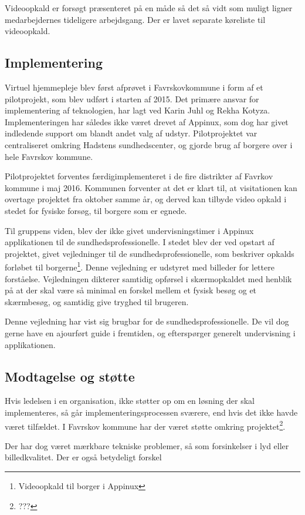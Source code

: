 Videoopkald er forsøgt præsenteret på en måde så det så vidt som muligt ligner medarbejdernes tideligere arbejdsgang. Der er lavet separate køreliste til videoopkald.

\subsection{Implementering}
Virtuel hjemmepleje blev først afprøvet i Favrskovkommune i form af et pilotprojekt, som blev udført i starten af 2015. Det primære ansvar for implementering af teknologien, har lagt ved Karin Juhl og Rekha Kotyza. Implementeringen har således ikke været drevet af Appinux, som dog har givet indledende support om blandt andet valg af udstyr. Pilotprojektet var centraliseret omkring Hadstens sundhedscenter, og gjorde brug af borgere over i hele Favrskov kommune.

Pilotprojektet forventes færdigimplementeret i de fire distrikter af Favrkov kommune i maj 2016. Kommunen forventer at det er klart til, at visitationen kan overtage projektet fra oktober samme år, og derved kan tilbyde video opkald i stedet for fysiske forsøg, til borgere som er egnede. 

Til gruppens viden, blev der ikke givet undervisningstimer i Appinux applikationen til de sundhedsprofessionelle. I stedet blev der ved opstart af projektet, givet vejledninger til de sundhedsprofessionelle, som beskriver opkalds forløbet til borgerne\footnote{Videoopkald til borger i Appinux}. Denne vejledning er udstyret med billeder for lettere forståelse. Vejledningen dikterer samtidig opførsel i skærmopkaldet med henblik på at der skal være så minimal en forskel mellem et fysisk besøg og et skærmbesøg, og samtidig give tryghed til brugeren. 

Denne vejledning har vist sig brugbar for de sundhedsprofessionelle. De vil dog gerne have en ajourført guide i fremtiden, og efterspørger generelt undervisning i applikationen.
 
\subsection{Modtagelse og støtte}
Hvis ledelsen i en organisation, ikke støtter op om en løsning der skal implementeres, så går implementeringsprocessen sværere, end hvis det ikke havde været tilfældet. I Favrskov kommune har der været støtte omkring projektet\footnote{???}. 

Der har dog været mærkbare tekniske problemer, så som forsinkelser i lyd eller billedkvalitet. Der er også betydeligt forskel 

